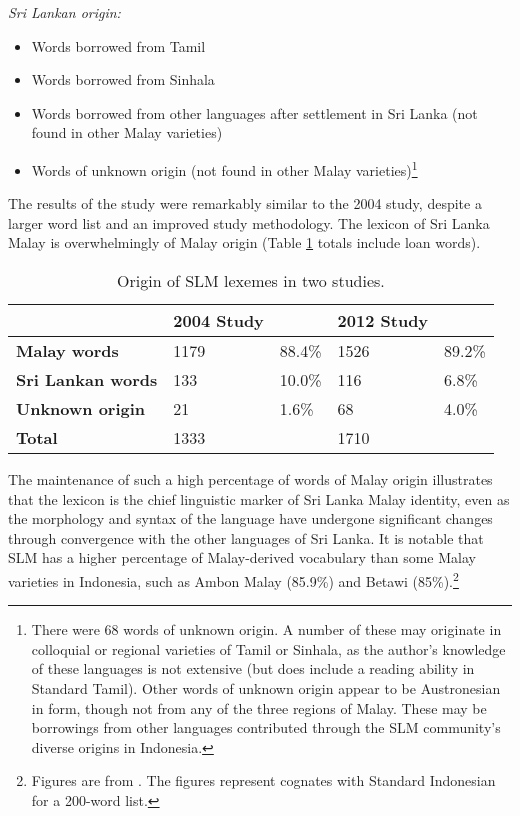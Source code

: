 \textit{Sri Lankan origin:}

\begin{itemize}
\item Words borrowed from Tamil

\item Words borrowed from Sinhala

\item Words borrowed from other languages after settlement in Sri Lanka (not found in other Malay varieties)

\item Words of unknown origin (not found in other Malay varieties)\footnote{There
 were 68 words of unknown origin. A number of these may originate in colloquial or regional varieties of Tamil or Sinhala, as the author's knowledge of these languages is not extensive (but does include a reading ability in Standard Tamil). Other words of unknown origin appear to be Austronesian in form, though not from any of the three regions of Malay. These may be borrowings from other languages contributed through the SLM community's diverse origins in Indonesia. 
}
\end{itemize}


The results of the study were remarkably similar to the 2004 study, despite a larger word list and an improved study methodology. The lexicon of Sri Lanka Malay is overwhelmingly of Malay origin (Table \ref{paauw:tab:originsoflexemes} totals include loan words).

\begin{table}
\centering
\begin{tabular}{lllll}
 &
\textbf{2004 Study} &
 &
\textbf{2012 Study} &
\\\hline
\textbf{Malay words} &
1179 &
88.4\% &
1526 &
89.2\%\\
\textbf{Sri Lankan words} &
133 &
10.0\% &
116 &
 6.8\%\\
\textbf{Unknown origin} &
21 &
1.6\% &
68 &
 4.0\%\\\hline
\textbf{Total} &
1333 &
 &
1710 &
\\
\end{tabular}
\caption{Origin of SLM lexemes in two studies.}
\label{paauw:tab:originsoflexemes}
\end{table}

The maintenance of such a high percentage of words of Malay origin illustrates that the lexicon is the chief linguistic marker of Sri Lanka Malay identity, even as the morphology and syntax of the language have undergone significant changes through convergence with the other languages of Sri Lanka. It is notable that SLM has a higher percentage of Malay-derived vocabulary than some Malay varieties in Indonesia, such as Ambon Malay (85.9\%) and Betawi (85\%).\footnote{Figures
 are from \citet[3]{Blust1988}. The figures represent cognates with Standard Indonesian for a 200-word list. 
}


